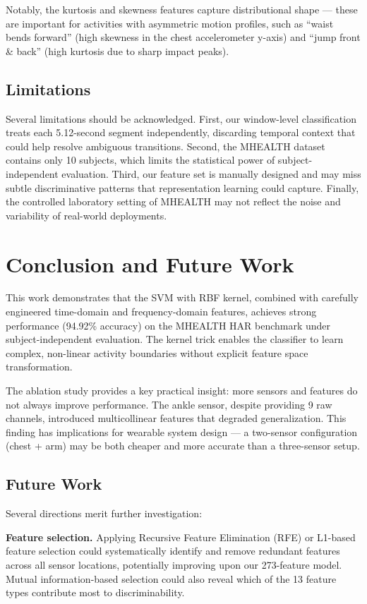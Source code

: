 \documentclass[10pt,twocolumn,letterpaper]{article}
\begin{document}
Notably, the kurtosis and skewness features capture distributional shape --- these are important for activities with asymmetric motion profiles, such as ``waist bends forward'' (high skewness in the chest accelerometer y-axis) and ``jump front \& back'' (high kurtosis due to sharp impact peaks).

\subsection{Limitations}
Several limitations should be acknowledged. First, our window-level classification treats each 5.12-second segment independently, discarding temporal context that could help resolve ambiguous transitions. Second, the MHEALTH dataset contains only 10 subjects, which limits the statistical power of subject-independent evaluation. Third, our feature set is manually designed and may miss subtle discriminative patterns that representation learning could capture. Finally, the controlled laboratory setting of MHEALTH may not reflect the noise and variability of real-world deployments.

\section{Conclusion and Future Work}

This work demonstrates that the SVM with RBF kernel, combined with carefully engineered time-domain and frequency-domain features, achieves strong performance (94.92\% accuracy) on the MHEALTH HAR benchmark under subject-independent evaluation. The kernel trick enables the classifier to learn complex, non-linear activity boundaries without explicit feature space transformation.

The ablation study provides a key practical insight: more sensors and features do not always improve performance. The ankle sensor, despite providing 9 raw channels, introduced multicollinear features that degraded generalization. This finding has implications for wearable system design --- a two-sensor configuration (chest + arm) may be both cheaper and more accurate than a three-sensor setup.

\subsection{Future Work}
Several directions merit further investigation:

\textbf{Feature selection.} Applying Recursive Feature Elimination (RFE) or L1-based feature selection could systematically identify and remove redundant features across all sensor locations, potentially improving upon our 273-feature model. Mutual information-based selection could also reveal which of the 13 feature types contribute most to discriminability.
\end{document}
